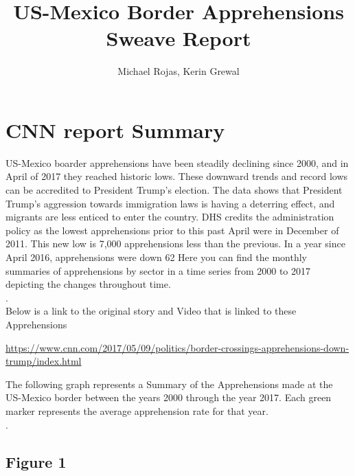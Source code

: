 \documentclass{article}
\title{US-Mexico Border Apprehensions Sweave Report}
\author{Michael Rojas, Kerin Grewal}
\begin{document}
\maketitle


\pagebreak

\section{CNN report Summary}

\begin{center}

US-Mexico boarder apprehensions have been steadily declining since 2000, and in April of 2017 they reached historic lows. These downward trends and record lows can be accredited to President Trump’s election. The data shows that President Trump’s aggression towards immigration laws is having a deterring effect, and migrants are less enticed to enter the country. DHS credits the administration policy as the lowest apprehensions prior to this past April were in December of 2011. This new low is 7,000 apprehensions less than the previous. In a year since April 2016, apprehensions were down 62%
Here you can find the monthly summaries of apprehensions by sector in a time series from 2000 to 2017 depicting the changes throughout time.\\
.\\

Below is a link to the original story and Video that is linked to these Apprehensions\\

\end{center}
\url{https://www.cnn.com/2017/05/09/politics/border-crossings-apprehensions-down-trump/index.html}\\

\begin{center}
The following graph represents a Summary of the Apprehensions made at the US-Mexico border between the years 2000 through the year 2017. Each green marker represents the average apprehension rate for that year.\\
.\\

\end{center}


\subsection{Figure 1}
\end{document}
